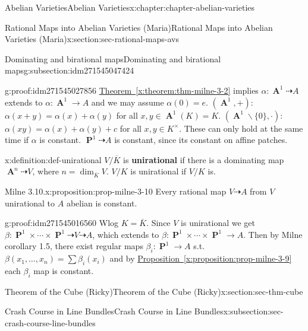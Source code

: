 \documentclass[oneside,10pt,]{book}
\newcommand{\terminology}[1]{\textbf{#1}}
\numberwithin{equation}{section}
\DeclareMathOperator{\aff}{\mathbf{A}}
\DeclareMathOperator{\PP}{\mathbf{P}}
\begin{document}
\begin{chapterptx}{Abelian Varieties}{}{Abelian Varieties}{}{}{x:chapter:chapter-abelian-varieties}
\begin{sectionptx}{Rational Maps into Abelian Varieties (Maria)}{}{Rational Maps into Abelian Varieties (Maria)}{}{}{x:section:sec-rational-maps-avs}
\begin{subsectionptx}{Dominating and birational maps}{}{Dominating and birational maps}{}{}{g:subsection:idm271545047424}
\begin{proofptx}{}{g:proof:idm271545027856}
\hyperref[x:theorem:thm-milne-3-2]{Theorem~\ref{x:theorem:thm-milne-3-2}} implies \(\alpha \colon \aff^1 \dashrightarrow A\) extends to \(\alpha \colon \aff^1\to A\) and we may assume \(\alpha(0) = e\). \((\aff^1, +)\): \(\alpha(x+y) = \alpha(x) + \alpha(y)\) for all \(x,y\in \aff^1(K) = K\). \((\aff^1\smallsetminus\{0\}, \cdot)\): \(\alpha(xy) = \alpha(x) + \alpha(y) + c\) for all \(x,y\in K^\times\). These can only hold at the same time if \(\alpha\) is constant. \(\PP^1 \dashrightarrow A\) is constant, since its constant on affine patches.%
\end{proofptx}
\begin{definition}{}{x:definition:def-unirational}%
\(V/\overline K\) is \terminology{unirational} if there is a dominating map \(\aff^n \dashrightarrow V\), where \(n = \dim_{\overline K} V\). \(V/K\) is unirational if \(V/K\) is.%
\end{definition}
\begin{proposition}{Milne 3.10.}{}{x:proposition:prop-milne-3-10}%
Every rational map \(V\dashrightarrow A\) from \(V\) unirational to \(A\) abelian is constant.%
\end{proposition}
\begin{proofptx}{}{g:proof:idm271545016560}
Wlog \(K = \overline K\). Since \(V\) is unirational we get \(\beta \colon \PP^1\times\cdots\times\PP^1 \dashrightarrow V\dashrightarrow A\), which extends to \(\beta \colon \PP^1\times\cdots\times\PP^1 \to A\). Then by Milne corollary 1.5, there exist regular maps \(\beta_i \colon \PP^1 \to A\) s.t. \(\beta(x_1,\ldots, x_n) = \sum \beta_i(x_i)\) and by \hyperref[x:proposition:prop-milne-3-9]{Proposition~\ref{x:proposition:prop-milne-3-9}} each \(\beta_i\) map is constant.%
\end{proofptx}
\end{subsectionptx}
\end{sectionptx}
%
%
\typeout{************************************************}
\typeout{************************************************}
%
\begin{sectionptx}{Theorem of the Cube (Ricky)}{}{Theorem of the Cube (Ricky)}{}{}{x:section:sec-thm-cube}
%
%
\typeout{************************************************}
\typeout{************************************************}
%
\begin{subsectionptx}{Crash Course in Line Bundles}{}{Crash Course in Line Bundles}{}{}{x:subsection:sec-crash-course-line-bundles}

\end{subsectionptx}
\end{sectionptx}
\end{chapterptx}
\end{document}
